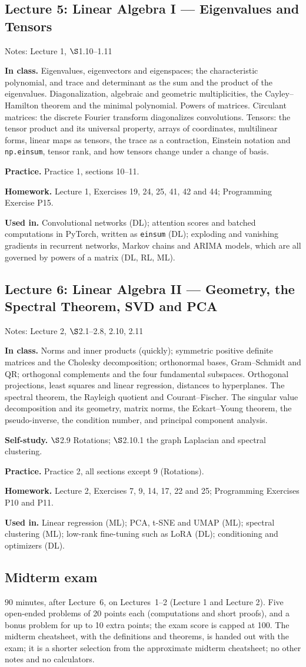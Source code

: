 \documentclass[11pt]{article}
\newcommand{\lecture}[3]{\subsection*{Lecture #1: #2}\textcolor{black!60}{Notes: #3}\par}
\newcommand{\block}[1]{\par\smallskip\textbf{#1}\quad}
\begin{document}
\lecture{5}{Linear Algebra I --- Eigenvalues and Tensors}{Lecture 1, $\S$1.10--1.11}
\block{In class.} Eigenvalues, eigenvectors and eigenspaces; the characteristic polynomial, and trace and determinant as the sum and the product of the eigenvalues. Diagonalization, algebraic and geometric multiplicities, the Cayley--Hamilton theorem and the minimal polynomial. Powers of matrices. Circulant matrices: the discrete Fourier transform diagonalizes convolutions. Tensors: the tensor product and its universal property, arrays of coordinates, multilinear forms, linear maps as tensors, the trace as a contraction, Einstein notation and \texttt{np.einsum}, tensor rank, and how tensors change under a change of basis.
\block{Practice.} Practice 1, sections 10--11.
\block{Homework.} Lecture 1, Exercises 19, 24, 25, 41, 42 and 44; Programming Exercise P15.
\block{Used in.} Convolutional networks (DL); attention scores and batched computations in PyTorch, written as \texttt{einsum} (DL); exploding and vanishing gradients in recurrent networks, Markov chains and ARIMA models, which are all governed by powers of a matrix (DL, RL, ML).

\lecture{6}{Linear Algebra II --- Geometry, the Spectral Theorem, SVD and PCA}{Lecture 2, $\S$2.1--2.8, 2.10, 2.11}
\block{In class.} Norms and inner products (quickly); symmetric positive definite matrices and the Cholesky decomposition; orthonormal bases, Gram--Schmidt and QR; orthogonal complements and the four fundamental subspaces. Orthogonal projections, least squares and linear regression, distances to hyperplanes. The spectral theorem, the Rayleigh quotient and Courant--Fischer. The singular value decomposition and its geometry, matrix norms, the Eckart--Young theorem, the pseudo-inverse, the condition number, and principal component analysis.
\block{Self-study.} $\S$2.9 Rotations; $\S$2.10.1 the graph Laplacian and spectral clustering.
\block{Practice.} Practice 2, all sections except 9 (Rotations).
\block{Homework.} Lecture 2, Exercises 7, 9, 14, 17, 22 and 25; Programming Exercises P10 and P11.
\block{Used in.} Linear regression (ML); PCA, t-SNE and UMAP (ML); spectral clustering (ML); low-rank fine-tuning such as LoRA (DL); conditioning and optimizers (DL).


\subsection*{Midterm exam}
$90$ minutes, after Lecture~6, on Lectures~1--2 (Lecture 1 and Lecture 2). Five open-ended problems of 20 points each (computations and short proofs), and a bonus problem for up to 10 extra points; the exam score is capped at 100. The midterm cheatsheet, with the definitions and theorems, is handed out with the exam; it is a shorter selection from the approximate midterm cheatsheet; no other notes and no calculators.
\end{document}
